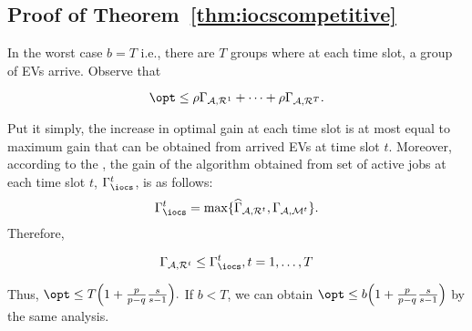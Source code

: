 

\vspace{-3mm}
\subsection{Proof of Theorem~\ref{thm:iocscompetitive}}	
\label{app:iocscompetitive}	

In the worst case $b=T$ i.e., there are $T$ groups where at each time slot, a group of EVs arrive. Observe that 

$$\opt\leq\rho\Gamma_{\mathcal{A},\mathcal{R}^1}+\dots +\rho\Gamma_{\mathcal{A},\mathcal{R}^T}.$$ 

Put it simply, the increase in optimal gain at each time slot is at most equal to maximum gain that can be obtained from arrived EVs at time slot $t$. Moreover, according to the \iocs, the gain of the algorithm obtained from set of active jobs at each time slot $t$, $\Gamma_{\iocs}^t$, is as follows: $$\Gamma_{\iocs}^t=\max\{\widehat{\Gamma}_{\mathcal{A},\mathcal{R}^t},\Gamma_{\mathcal{A},\mathcal{M}^t}\}.$$ Therefore, 

$$\Gamma_{\mathcal{A},\mathcal{R}^t}\leq \Gamma_{\iocs}^t, t=1, \dots ,T$$

Thus, $\opt\leq T\Big(1+\frac{p}{p-q}\frac{s}{s-1}\Big).$ If $b<T$, we can obtain $\opt\leq b\Big(1+\frac{p}{p-q}\frac{s}{s-1}\Big)$ by the same analysis.



